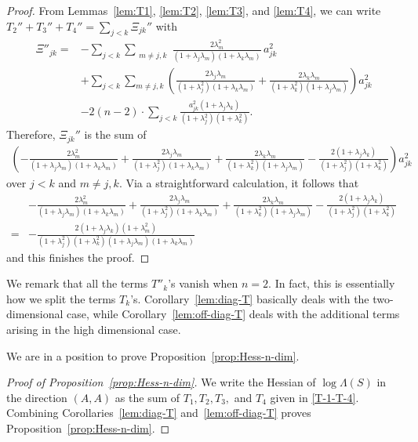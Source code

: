 \documentclass[11pt]{amsart}
\numberwithin{equation}{section}
\theoremstyle{definition}
\theoremstyle{definition}
\newcommand{\pr}[1]{\left(#1\right)}
\begin{document}
\begin{proof}
	From Lemmas~\ref{lem:T1}, \ref{lem:T2}, \ref{lem:T3}, and \ref{lem:T4}, we can write
	$T_2''+T_3''+T_4''
	=\sum\limits_{j<k} \Xi_{jk}''$
	with
	\begin{align*}
	\Xi''_{jk}
	= &
	-\sum_{j<k}\sum_{\substack{m\neq j,k}}
	\frac{2\lambda_m^2}
	{(1+\lambda_j\lambda_m)(1+\lambda_k\lambda_m)}
	\, a_{jk}^2\\
	& +  \sum_{j<k}
	\sum_{m\neq j,k}
	\pr{
		\frac{2\lambda_j\lambda_m}{(1+\lambda_j^2)(1+\lambda_k\lambda_m)}
		+ \frac{2\lambda_k\lambda_m}{(1+\lambda_k^2)(1+\lambda_j\lambda_m)}
	}a_{jk}^2\\
	& - 2(n-2)\cdot \sum_{j<k} 
	\frac{a_{jk}^2\pr{1+\lambda_j\lambda_k}}{(1+\lambda_j^2)(1+\lambda_k^2)}.
	\end{align*}
	Therefore, $\Xi_{jk}''$ is the sum of
	\begin{align*}
	\pr{
		-\frac{2\lambda_m^2}
		{(1+\lambda_j\lambda_m)(1+\lambda_k\lambda_m)}
		+ \frac{2\lambda_j\lambda_m}{(1+\lambda_j^2)(1+\lambda_k\lambda_m)}
		+ \frac{2\lambda_k\lambda_m}{(1+\lambda_k^2)(1+\lambda_j\lambda_m)}
		- \frac{2(1+\lambda_j\lambda_k)}{(1+\lambda_j^2)(1+\lambda_k^2)}
	}a_{jk}^2
	\end{align*}
	over $j<k$ and $m\neq j,k.$
    Via a straightforward calculation, it follows that
    \begin{align*}
    &-\frac{2\lambda_m^2}
		{(1+\lambda_j\lambda_m)(1+\lambda_k\lambda_m)}
		+ \frac{2\lambda_j\lambda_m}{(1+\lambda_j^2)(1+\lambda_k\lambda_m)}
		+ \frac{2\lambda_k\lambda_m}{(1+\lambda_k^2)(1+\lambda_j\lambda_m)}
		- \frac{2(1+\lambda_j\lambda_k)}{(1+\lambda_j^2)(1+\lambda_k^2)}\\
    = &-\frac{2(1+\lambda_j\lambda_k)(1+\lambda_m^2)}
	{(1+\lambda_j^2)(1+\lambda_k^2)(1+\lambda_j\lambda_m)(1+\lambda_k\lambda_m)}
    \end{align*}
    and this finishes the proof. 
\end{proof}




We remark that all the terms $T''_k$'s vanish when $n=2.$
In fact, this is essentially how we split the terms $T_k$'s.
Corollary~\ref{lem:diag-T} basically deals with the two-dimensional case, while Corollary~\ref{lem:off-diag-T} deals with the additional terms arising in the high dimensional case.


We are in a position to prove Proposition~\ref{prop:Hess-n-dim}.

\begin{proof}
	[Proof of Proposition~\ref{prop:Hess-n-dim}]
	We write the Hessian of $\log \Lambda(S)$ in the direction $(A,A)$ as the sum of $T_1,T_2,T_3,$ and $T_4$ given in \eqref{T-1-T-4}.
	Combining Corollaries~\ref{lem:diag-T} and~\ref{lem:off-diag-T} proves Proposition~\ref{prop:Hess-n-dim}.
\end{proof}
\end{document}
